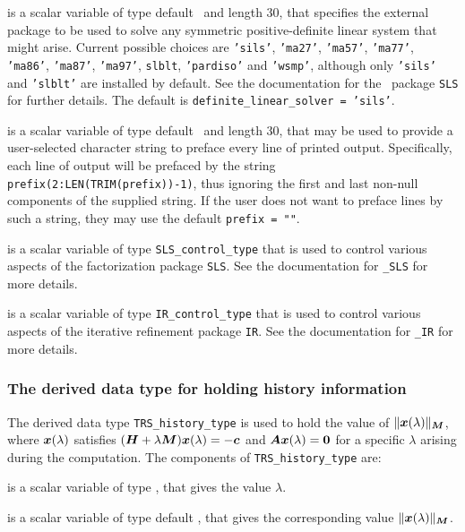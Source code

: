 \documentclass{galahad}
\newcommand{\packagename}{TRS}
\begin{document}
\begin{description}
 is a scalar variable of type default \character\
and length 30, that specifies the external package to be used to
solve any symmetric positive-definite linear system that might arise.
Current possible
choices are {\tt 'sils'}, {\tt 'ma27'}, {\tt 'ma57'}, {\tt 'ma77'},
{\tt 'ma86'}, {\tt 'ma87'}, {\tt 'ma97'}, {\tt slblt}, {\tt 'pardiso'}
and {\tt 'wsmp'},
although only {\tt 'sils'} and {\tt 'slblt'} are installed by default.
See the documentation for the \galahad\ package {\tt SLS} for further details.
The default is {\tt definite\_linear\_solver = 'sils'}.

 is a scalar variable of type default \character\
and length 30, that may be used to provide a user-selected
character string to preface every line of printed output.
Specifically, each line of output will be prefaced by the string
{\tt prefix(2:LEN(TRIM(prefix))-1)},
thus ignoring the first and last non-null components of the
supplied string. If the user does not want to preface lines by such
a string, they may use the default {\tt prefix = ""}.

 is a scalar variable of type
{\tt SLS\_control\_type} that is used to control various aspects of the
factorization package {\tt SLS}. See the documentation for
{\tt \libraryname\_SLS} for more details.

 is a scalar variable of type
{\tt IR\_control\_type} that is used to control various aspects of the
iterative refinement package {\tt IR}. See the documentation for
{\tt \libraryname\_IR} for more details.

\end{description}


\subsubsection{The derived data type for holding history
 information}\label{typehist}
The derived data type
{\tt \packagename\_history\_type}
is used to hold the value of $\|{\bm{x}}(\lambda)\|_{{\bm{M}}}$, where
${\bm{x}}(\lambda)$ satisfies
$({\bm{H}} + \lambda {\bm{M}}){\bm{x}}(\lambda) = - {\bm{c}}$ and ${\bm{A}}{\bm{x}}(\lambda) = {\bm{0}}$
for a specific $\lambda$ arising during the computation.
The components of
{\tt \packagename\_history\_type}
are:
\begin{description}
 is a scalar variable of type \realdp, that gives
 the value $\lambda$.

 is a scalar variable of type default \real, that gives
 the corresponding value $\|{\bm{x}}(\lambda)\|_{{\bm{M}}}$.

\end{description}
\end{document}
